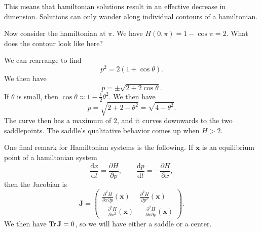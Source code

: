 This means that hamiltonian solutions result in an effective decrease in dimension. Solutions can only wander along individual contours of a hamiltonian.

Now consider the hamiltonian at $\pi $. We have $H(0,\pi )=1-\cos \pi =2$. What does the contour look like here?

We can rearrange to find
\[
	p^2=2\left( 1+\cos \theta  \right) 
.\]
We then have
\[
	p=\pm \sqrt{2+2\cos \theta } 
.\]
If $\theta $ is small, then $\cos \theta \approx 1-\frac{1}{2}\theta ^2$. We then have
\[
	p=\sqrt{2+2-\theta ^2} =\sqrt{4-\theta ^2} 
.\]
The curve then has a maximum of $2$, and it curves downwards to the two saddlepoints. The saddle's qualitative behavior comes up when $H>2$.

One final remark for Hamiltonian systems is the following. If $\mathbf{x}$ is an equilibrium point of a hamiltonian system
\[
	\frac{\mathrm{d}x}{\mathrm{d}t} =\frac{\partial H}{\partial p} ,\qquad \frac{\mathrm{d}p}{\mathrm{d}t} =-\frac{\partial H}{\partial x} 
,\]
then the Jacobian is
\[
	\mathbf{J}=\begin{pmatrix}
		\frac{\partial ^2H}{\partial x\partial p} (\mathbf{x})&\frac{\partial ^2H}{\partial p^2} (\mathbf{x})\\
		-\frac{\partial ^2H}{\partial x^2} (\mathbf{x})&-\frac{\partial ^2H}{\partial x\partial p} (\mathbf{x})
	\end{pmatrix} 
.\]
We then have $\operatorname{Tr} \mathbf{J}=0$, so we will have either a saddle or a center.
